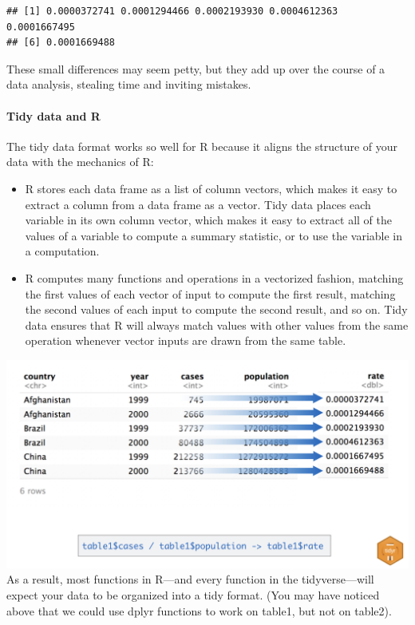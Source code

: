 \documentclass[
]{article}
\begin{document}
\begin{verbatim}
## [1] 0.0000372741 0.0001294466 0.0002193930 0.0004612363 0.0001667495
## [6] 0.0001669488
\end{verbatim}

These small differences may seem petty, but they add up over the course
of a data analysis, stealing time and inviting mistakes.

\hypertarget{tidy-data-and-r}{%
\paragraph{Tidy data and R}\label{tidy-data-and-r}}

The tidy data format works so well for R because it aligns the structure
of your data with the mechanics of R:

\begin{itemize}
\item
  R stores each data frame as a list of column vectors, which makes it
  easy to extract a column from a data frame as a vector. Tidy data
  places each variable in its own column vector, which makes it easy to
  extract all of the values of a variable to compute a summary
  statistic, or to use the variable in a computation.
\item
  R computes many functions and operations in a vectorized fashion,
  matching the first values of each vector of input to compute the first
  result, matching the second values of each input to compute the second
  result, and so on. Tidy data ensures that R will always match values
  with other values from the same operation whenever vector inputs are
  drawn from the same table.
\end{itemize}

\includegraphics{data/vectorized.png} As a result, most functions in
R---and every function in the tidyverse---will expect your data to be
organized into a tidy format. (You may have noticed above that we could
use dplyr functions to work on table1, but not on table2).
\end{document}
